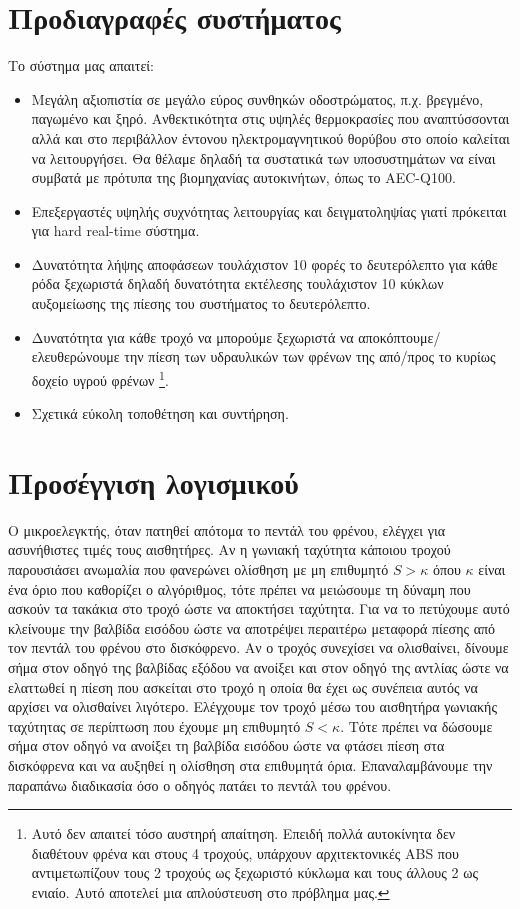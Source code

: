 \documentclass{article}
\begin{document}
\section{Προδιαγραφές συστήματος}
Το σύστημα μας απαιτεί:
\begin{itemize}

\item Μεγάλη αξιοπιστία σε μεγάλο εύρος συνθηκών οδοστρώματος, π.χ. βρεγμένο, παγωμένο και ξηρό. Ανθεκτικότητα στις υψηλές θερμοκρασίες που αναπτύσσονται αλλά και στο περιβάλλον έντονου ηλεκτρομαγνητικού θορύβου στο οποίο καλείται να λειτουργήσει. Θα θέλαμε δηλαδή τα συστατικά των υποσυστημάτων να είναι συμβατά με πρότυπα της βιομηχανίας αυτοκινήτων, όπως το AEC-Q100.
\item Επεξεργαστές υψηλής συχνότητας λειτουργίας και δειγματοληψίας γιατί πρόκειται για hard real-time σύστημα.
\item {Δυνατότητα λήψης αποφάσεων τουλάχιστον 10 φορές το δευτερόλεπτο για κάθε ρόδα ξεχωριστά δηλαδή δυνατότητα εκτέλεσης τουλάχιστον 10 κύκλων αυξομείωσης της πίεσης του συστήματος το δευτερόλεπτο.}\label{tenTimesPerSec}
\item Δυνατότητα για κάθε τροχό να μπορούμε ξεχωριστά να αποκόπτουμε/ελευθερώνουμε την πίεση των υδραυλικών των φρένων της από/προς το κυρίως δοχείο υγρού φρένων \footnote{Αυτό δεν απαιτεί τόσο αυστηρή απαίτηση. Επειδή πολλά αυτοκίνητα δεν διαθέτουν φρένα και στους 4 τροχούς, υπάρχουν αρχιτεκτονικές ABS που αντιμετωπίζουν τους 2 τροχούς ως ξεχωριστό κύκλωμα και τους άλλους 2 ως ενιαίο. Αυτό αποτελεί μια απλούστευση στο πρόβλημα μας. }.
\item Σχετικά εύκολη τοποθέτηση και συντήρηση.
\end{itemize}

\section{Προσέγγιση λογισμικού}
Ο μικροελεγκτής, όταν πατηθεί απότομα το πεντάλ του φρένου, ελέγχει για ασυνήθιστες τιμές τους αισθητήρες. Αν η γωνιακή ταχύτητα κάποιου τροχού παρουσιάσει ανωμαλία που φανερώνει ολίσθηση με μη επιθυμητό $S>\kappa$ όπου $\kappa$ είναι ένα όριο που καθορίζει ο αλγόριθμος, τότε πρέπει να μειώσουμε τη δύναμη που ασκούν τα τακάκια στο τροχό ώστε να αποκτήσει ταχύτητα. Για να το πετύχουμε αυτό κλείνουμε την βαλβίδα εισόδου ώστε να αποτρέψει περαιτέρω μεταφορά πίεσης από τον πεντάλ του φρένου στο δισκόφρενο. Αν ο τροχός συνεχίσει να ολισθαίνει, δίνουμε σήμα στον οδηγό της βαλβίδας εξόδου να ανοίξει και στον οδηγό της αντλίας ώστε να ελαττωθεί η πίεση που ασκείται στο τροχό η οποία θα έχει ως συνέπεια αυτός να αρχίσει να ολισθαίνει λιγότερο. Ελέγχουμε τον τροχό μέσω του αισθητήρα γωνιακής ταχύτητας σε περίπτωση που έχουμε μη επιθυμητό $S<\kappa$. Τότε πρέπει να δώσουμε σήμα στον οδηγό να ανοίξει τη βαλβίδα εισόδου ώστε να φτάσει πίεση στα δισκόφρενα και να αυξηθεί η ολίσθηση στα επιθυμητά όρια. Επαναλαμβάνουμε την παραπάνω διαδικασία όσο ο οδηγός πατάει το πεντάλ του φρένου.
\end{document}
